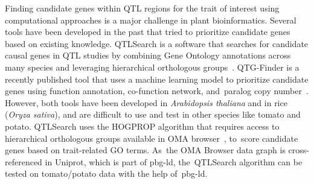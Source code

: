 \documentclass[applsci,article,accept,moreauthors,pdftex]{Definitions/mdpi}
\begin{document}
{Finding candidate genes within QTL regions for the trait of interest %
using computational approaches is a major challenge in plant bioinformatics. Several tools have been developed in the past that tried to prioritize candidate genes based on existing knowledge. QTLSearch is a software %
that searches for candidate causal genes in QTL studies by combining Gene Ontology annotations across many species and leveraging hierarchical orthologous groups~\cite{warwick2018prioritising}.
QTG-Finder is a recently published tool %
that uses a machine learning model to prioritize candidate genes %
using function annotation, co-function network, and~paralog copy number~\cite{lin2019qtg}.
However, both tools %
have been developed in \textit{Arabidopsis thaliana} and in %
rice (\textit{Oryza sativa}), %
and are difficult to use and test %
in other species like tomato and potato. QTLSearch uses the HOGPROP %
algorithm that requires access to hierarchical orthologous groups available in OMA browser~\cite{schneider2007oma}, to~score candidate genes based on trait-related GO terms.
As~the OMA Browser %
data graph is cross-referenced in Uniprot, which is part of pbg-ld, the~QTLSearch algorithm can be tested on %
tomato/potato data with the help of~pbg-ld.

}
\end{document}
